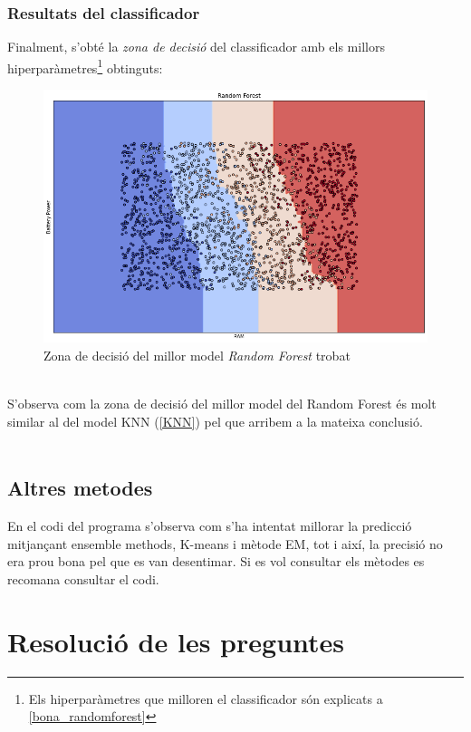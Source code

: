 \documentclass[a4paper, 11pt]{article}
\begin{document}
\subsubsection{Resultats del classificador}\label{zona_randomforest}
Finalment, s'obté la \textit{zona de decisió} del classificador amb els millors hiperparàmetres\footnote{Els hiperparàmetres que milloren el classificador són explicats a \textcolor{blue}{\ref{bona_randomforest}}} obtinguts:\\
\begin{figure}[h]
    \centering
    \includegraphics[width = 1\textwidth]{ZonasModelos/zona_random.png}
    \caption{Zona de decisió del millor model \textit{Random Forest} trobat}
    \label{fig:my_label}
\end{figure}\\
S'observa com la zona de decisió del millor model del Random Forest és molt similar al del model KNN (\textcolor{blue}{\ref{KNN}}) pel que arribem a la mateixa conclusió.\\\\
\newpage



\subsection{Altres metodes}
En el codi del programa s'observa com s'ha intentat millorar la predicció mitjançant ensemble methods, K-means i mètode EM, tot i així, la precisió no era prou bona pel que es van desentimar. Si es vol consultar els mètodes es recomana consultar el codi.



\newpage
\section{Resolució de les preguntes}
\end{document}
